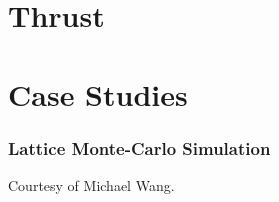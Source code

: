 \documentclass{beamer}
\begin{document}



\section{Thrust}


\section{Case Studies}



\begin{frame}
  \frametitle{Lattice Monte-Carlo Simulation}
  Courtesy of Michael Wang.
\end{frame}




\end{document}
